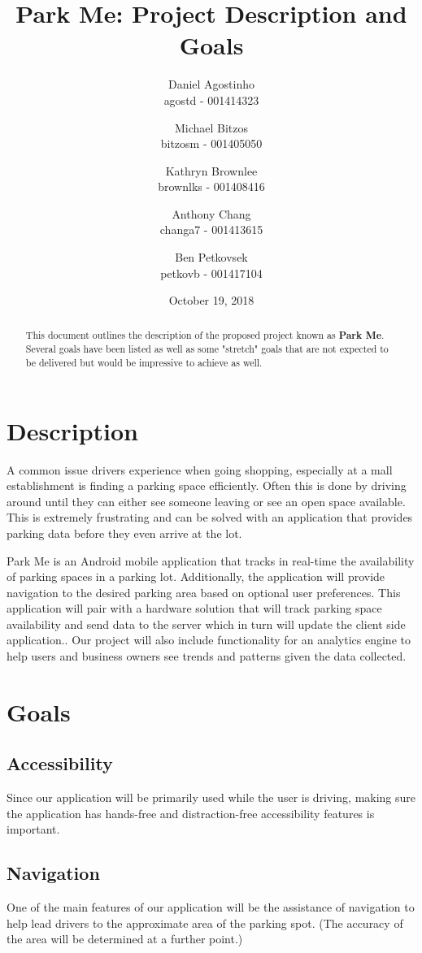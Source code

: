 \documentclass[]{article}
\title{Park Me: Project Description and Goals}
\author{Daniel Agostinho\\agostd - 001414323 \and Michael Bitzos\\bitzosm - 001405050 \and Kathryn Brownlee\\brownlks - 001408416  \and Anthony Chang\\changa7 - 001413615 \and Ben Petkovsek\\petkovb - 001417104}
\begin{document}
\date{October 19, 2018}
\maketitle


\begin{abstract}
	This document outlines the description of the proposed project known as \textbf{Park Me}. Several goals have been listed as well as some "stretch" goals that are not expected to be delivered but would be impressive to achieve as well.
\end{abstract}

\section{Description}
A common issue drivers experience when going shopping, especially at a mall establishment is finding a parking space efficiently. Often this is done by driving around until they can either see someone leaving or see an open space available. This is extremely frustrating and can be solved with an application that provides parking data before they even arrive at the lot.

	Park Me is an Android mobile application that tracks in real-time the
availability of parking spaces in a parking lot. Additionally, the application will provide navigation to the desired parking area based on optional user preferences. This application will pair with a hardware solution that will track parking space availability and send data to the server which in turn will update the client side application.. Our project will also include functionality for an analytics engine to help users and business owners see trends and patterns given the data collected.

\section{Goals}

\subsection{Accessibility}
Since our application will be primarily used while the user is driving, making sure the application has hands-free and distraction-free accessibility features is important.

\subsection{Navigation}
One of the main features of our application will be the assistance of navigation to help lead drivers to the approximate area of the parking spot. (The accuracy of the area will be determined at a further point.)
\end{document}
